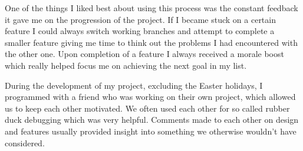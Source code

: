 One of the things I liked best about using this process was the constant feedback it gave me on the progression of the project.
If I became stuck on a certain feature I could always switch working branches and attempt to complete a smaller feature giving me time to think out the problems I had encountered with the other one.
Upon completion of a feature I always received a morale boost which really helped focus me on achieving the next goal in my list\cite{GETTING-REAL}.

During the development of my project, excluding the Easter holidays, I programmed with a friend who was working on their own project, which allowed us to keep each other motivated.
We often used each other for so called rubber duck debugging\cite{RUBBER-DUCK-DEBUG} which was very helpful. 
Comments made to each other on design and features usually provided insight into something we otherwise wouldn't have considered.

















